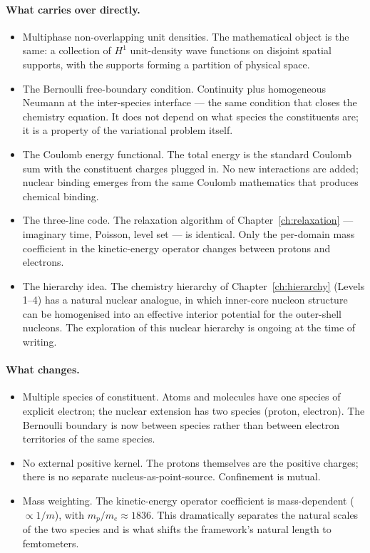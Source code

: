 \paragraph{What carries over directly.}
\begin{itemize}
\item Multiphase non-overlapping unit densities. The mathematical object is the same: a collection of $H^1$ unit-density wave functions on disjoint spatial supports, with the supports forming a partition of physical space.
\item The Bernoulli free-boundary condition. Continuity plus homogeneous Neumann at the inter-species interface --- the same condition that closes the chemistry equation. It does not depend on what species the constituents are; it is a property of the variational problem itself.
\item The Coulomb energy functional. The total energy is the standard Coulomb sum with the constituent charges plugged in. No new interactions are added; nuclear binding emerges from the same Coulomb mathematics that produces chemical binding.
\item The three-line code. The relaxation algorithm of Chapter~\ref{ch:relaxation} --- imaginary time, Poisson, level set --- is identical. Only the per-domain mass coefficient in the kinetic-energy operator changes between protons and electrons.
\item The hierarchy idea. The chemistry hierarchy of Chapter~\ref{ch:hierarchy} (Levels 1--4) has a natural nuclear analogue, in which inner-core nucleon structure can be homogenised into an effective interior potential for the outer-shell nucleons. The exploration of this nuclear hierarchy is ongoing at the time of writing.
\end{itemize}

\paragraph{What changes.}
\begin{itemize}
\item Multiple species of constituent. Atoms and molecules have one species of explicit electron; the nuclear extension has two species (proton, electron). The Bernoulli boundary is now between species rather than between electron territories of the same species.
\item No external positive kernel. The protons themselves are the positive charges; there is no separate nucleus-as-point-source. Confinement is mutual.
\item Mass weighting. The kinetic-energy operator coefficient is mass-dependent ($\propto 1/m$), with $m_p / m_e \approx 1836$. This dramatically separates the natural scales of the two species and is what shifts the framework's natural length to femtometers.
\end{itemize}

